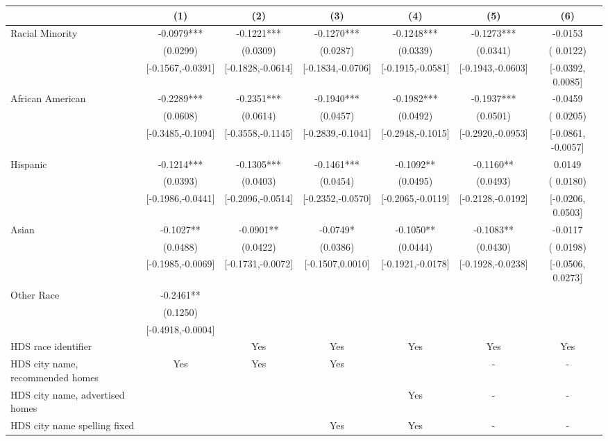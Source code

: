 \begin{table}[htbp]
{\begin{tabular}{l*{6}{c}}
                    \cmidrule(lr){2-2}\cmidrule(lr){3-3}\cmidrule(lr){4-4}\cmidrule(lr){5-5}\cmidrule(lr){6-6}\cmidrule(lr){7-7}
                    &\multicolumn{1}{c}{(1)}   &\multicolumn{1}{c}{(2)}   &\multicolumn{1}{c}{(3)}   &\multicolumn{1}{c}{(4)}   &\multicolumn{1}{c}{(5)}   &\multicolumn{1}{c}{(6)}\\
\midrule
Racial Minority & -0.0979*** & -0.1221*** & -0.1270*** & -0.1248*** & -0.1273*** & -0.0153 \\
 & (0.0299) & (0.0309) & (0.0287) & (0.0339) & (0.0341) & ( 0.0122) \\
 & [-0.1567,-0.0391] & [-0.1828,-0.0614] & [-0.1834,-0.0706] & [-0.1915,-0.0581] & [-0.1943,-0.0603] & [-0.0392,  0.0085] \\
\midrule
African American & -0.2289*** & -0.2351*** & -0.1940*** & -0.1982*** & -0.1937*** & -0.0459\sym{**} \\
 & (0.0608) & (0.0614) & (0.0457) & (0.0492) & (0.0501) & ( 0.0205) \\
 & [-0.3485,-0.1094] & [-0.3558,-0.1145] & [-0.2839,-0.1041] & [-0.2948,-0.1015] & [-0.2920,-0.0953] & [-0.0861, -0.0057] \\
Hispanic & -0.1214*** & -0.1305*** & -0.1461*** & -0.1092** & -0.1160** & 0.0149 \\
 & (0.0393) & (0.0403) & (0.0454) & (0.0495) & (0.0493) & ( 0.0180) \\
 & [-0.1986,-0.0441] & [-0.2096,-0.0514] & [-0.2352,-0.0570] & [-0.2065,-0.0119] & [-0.2128,-0.0192] & [-0.0206,  0.0503] \\
Asian & -0.1027** & -0.0901** & -0.0749* & -0.1050** & -0.1083** & -0.0117 \\
 & (0.0488) & (0.0422) & (0.0386) & (0.0444) & (0.0430) & ( 0.0198) \\
 & [-0.1985,-0.0069] & [-0.1731,-0.0072] & [-0.1507,0.0010] & [-0.1921,-0.0178] & [-0.1928,-0.0238] & [-0.0506,  0.0273] \\
Other Race & -0.2461** &  &  &  &  &  \\
 & (0.1250) &  &  &  &  &  \\
 & [-0.4918,-0.0004] &  &  &  &  &  \\
\midrule
HDS race identifier & & Yes & Yes & Yes & Yes & Yes \\
HDS city name, recommended homes & Yes & Yes & Yes & & - & -\\
HDS city name, advertised homes &  &  &  & Yes & - & -\\
HDS city name spelling fixed & & & Yes & Yes & - & -\\

\end{tabular}}
\end{table}
